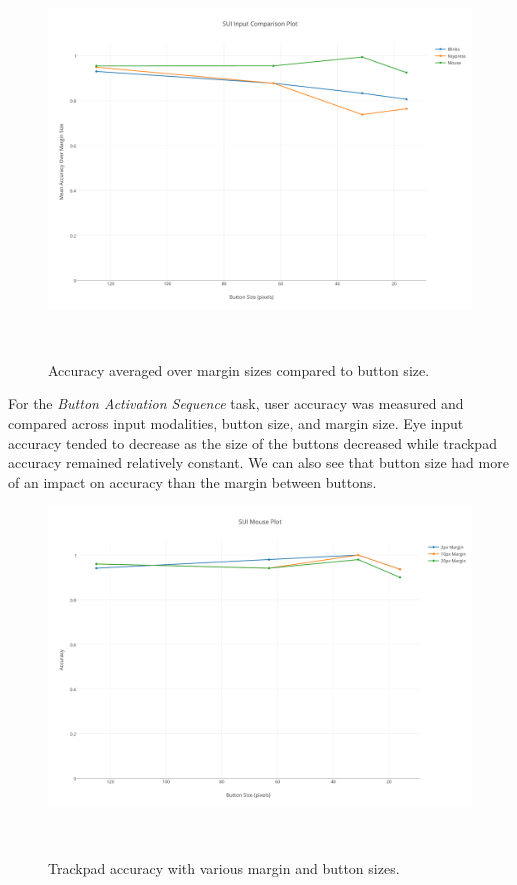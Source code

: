 \documentclass{sigchi}
\begin{document}
\begin{figure}
\centering
  \includegraphics[width=0.9\columnwidth]{figures/mean-accuracy.pdf}
  \caption{Accuracy averaged over margin sizes compared to button size.
  }~\label{fig:mean-accuracy}
\end{figure}

For the \emph{Button Activation Sequence} task, user accuracy was measured and compared across input modalities, button size, and margin size. Eye input accuracy tended to decrease as the size of the buttons decreased while trackpad accuracy remained relatively constant. We can also see that button size had more of an impact on accuracy than the margin between buttons.

\begin{figure}
\centering
  \includegraphics[width=0.9\columnwidth]{figures/mouse-accuracy.pdf}
  \caption{Trackpad accuracy with various margin and button sizes.
  }~\label{fig:mouse-accuracy}
\end{figure}
\end{document}
